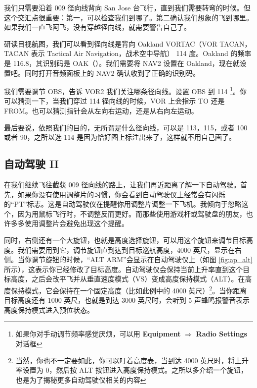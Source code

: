 我们只需要沿着 009 径向线背向 San Jose 台飞行，直到我们需要转弯的时候。但这个交汇点很重要：第一，可以检查我们到哪了。第二确认我们想象的飞到哪里。如果我们一直飞阿飞，没有穿越径向线，就需要警告自己了。

研读目视航图，我们可以看到径向线是背向 Oakland VORTAC（VOR TACAN，TACAN 表示 Tactical Air Navigation，战术空中导航） 114 度。Oakland 的频率是 116.8，其识别码是 OAK（\mdash\mdash\mdash\mspace \mdot\mdash\mspace \mdash\mdot\mdash）。我们需要将 NAV2 设置在 Oakland，现在就设置吧。同时打开音频面板上的 NAV2 确认收到了正确的识别码。

我们需要调节 OBS，告诉 VOR2 我们关注哪条径向线。设置 OBS 到 114 \footnote{如果你对手动调节频率感觉厌烦，可以用 \textbf{\textsf{Equipment}} $\Rightarrow$ \textbf{\textsf{Radio Settings}} 对话框}。你可以猜测一下，当我们穿过 114 径向线的时候，VOR 上会指示 TO 还是 FROM。也可以猜测指针会从左向右运动，还是从右向左运动。

最后要说，依照我们的目的，无所谓是什么径向线，可以是 113，115，或者 100 或者 90，之所以选 114 是因为恰好图上标注出来了，这样就不用自己画了。

\subsection{自动驾驶 II}

在我们继续飞往截获 009 径向线的路上，让我们再近距离了解一下自动驾驶。首先，如果你没有使用调整片的习惯，你会看到自动驾驶仪上经常会有闪烁的“PT”标志。这是自动驾驶仪在提醒你用调整片调整一下飞机。我倾向于忽略这个，因为用鼠标飞行时，不调整反而更好。而那些使用游戏杆或驾驶盘的朋友，也许多多使用调整片会避免出现这个提醒。

同时，右侧还有一个大旋钮，也就是高度选择旋钮，可以用这个旋钮来调节目标高度。我们需要用到它，调节旋钮直到达到目标巡航高度，4000 英尺，显示在右侧。当你调节旋钮的时候，“ALT ARM”会显示在自动驾驶仪上（如图 \ref{fig:ap_alt} 所示），这表示你已经修改了目标高度。自动驾驶仪会保持当前上升率直到这个目标高度，之后会改平飞并从垂直速度模式（VS）变成高度保持模式（ALT）。在高度保持模式，它会保持在一个固定高度（比如此例中的 4000 英尺）\footnote{当然，你也不一定要如此，你可以叮着高度表，当到达 4000 英尺时，将上升率设置为 0，然后按 ALT 按钮进入高度保持模式。之所以多介绍一个旋钮，也是为了揭秘更多自动驾驶仪相关的内容}。当你距离目标高度还有 1000 英尺，也就是到达 3000 英尺时，会听到 5 声蜂鸣报警音表示高度保持模式进入预位状态。


